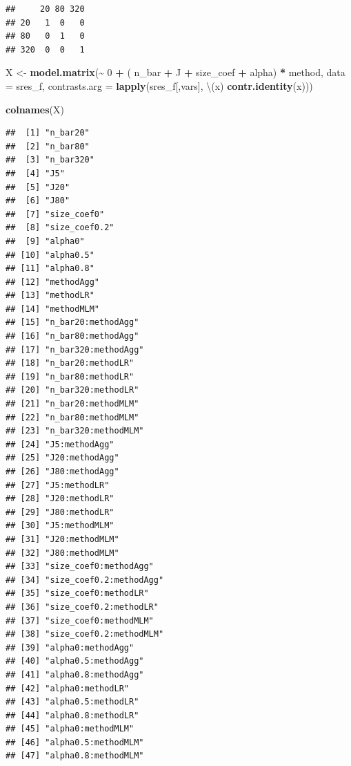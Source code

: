 \documentclass[
]{book}
\newenvironment{Shaded}{\begin{snugshade}}{\end{snugshade}}
\newcommand{\AttributeTok}[1]{\textcolor[rgb]{0.13,0.29,0.53}{#1}}
\newcommand{\DecValTok}[1]{\textcolor[rgb]{0.00,0.00,0.81}{#1}}
\newcommand{\FunctionTok}[1]{\textcolor[rgb]{0.13,0.29,0.53}{\textbf{#1}}}
\newcommand{\NormalTok}[1]{#1}
\newcommand{\OtherTok}[1]{\textcolor[rgb]{0.56,0.35,0.01}{#1}}
\newcommand{\SpecialCharTok}[1]{\textcolor[rgb]{0.81,0.36,0.00}{\textbf{#1}}}
\begin{document}
\begin{verbatim}
##     20 80 320
## 20   1  0   0
## 80   0  1   0
## 320  0  0   1
\end{verbatim}

\begin{Shaded}
\begin{Highlighting}[]
\NormalTok{X }\OtherTok{\textless{}{-}} \FunctionTok{model.matrix}\NormalTok{(}\SpecialCharTok{\textasciitilde{}} \DecValTok{0} \SpecialCharTok{+}\NormalTok{ ( n\_bar }\SpecialCharTok{+}\NormalTok{ J }\SpecialCharTok{+}\NormalTok{ size\_coef  }\SpecialCharTok{+}\NormalTok{ alpha) }\SpecialCharTok{*}\NormalTok{ method, }
                  \AttributeTok{data =}\NormalTok{ sres\_f,}
                  \AttributeTok{contrasts.arg =} \FunctionTok{lapply}\NormalTok{(sres\_f[,vars], }
\NormalTok{                                         \textbackslash{}(x) }\FunctionTok{contr.identity}\NormalTok{(x)))}

\FunctionTok{colnames}\NormalTok{(X)}
\end{Highlighting}
\end{Shaded}

\begin{verbatim}
##  [1] "n_bar20"               
##  [2] "n_bar80"               
##  [3] "n_bar320"              
##  [4] "J5"                    
##  [5] "J20"                   
##  [6] "J80"                   
##  [7] "size_coef0"            
##  [8] "size_coef0.2"          
##  [9] "alpha0"                
## [10] "alpha0.5"              
## [11] "alpha0.8"              
## [12] "methodAgg"             
## [13] "methodLR"              
## [14] "methodMLM"             
## [15] "n_bar20:methodAgg"     
## [16] "n_bar80:methodAgg"     
## [17] "n_bar320:methodAgg"    
## [18] "n_bar20:methodLR"      
## [19] "n_bar80:methodLR"      
## [20] "n_bar320:methodLR"     
## [21] "n_bar20:methodMLM"     
## [22] "n_bar80:methodMLM"     
## [23] "n_bar320:methodMLM"    
## [24] "J5:methodAgg"          
## [25] "J20:methodAgg"         
## [26] "J80:methodAgg"         
## [27] "J5:methodLR"           
## [28] "J20:methodLR"          
## [29] "J80:methodLR"          
## [30] "J5:methodMLM"          
## [31] "J20:methodMLM"         
## [32] "J80:methodMLM"         
## [33] "size_coef0:methodAgg"  
## [34] "size_coef0.2:methodAgg"
## [35] "size_coef0:methodLR"   
## [36] "size_coef0.2:methodLR" 
## [37] "size_coef0:methodMLM"  
## [38] "size_coef0.2:methodMLM"
## [39] "alpha0:methodAgg"      
## [40] "alpha0.5:methodAgg"    
## [41] "alpha0.8:methodAgg"    
## [42] "alpha0:methodLR"       
## [43] "alpha0.5:methodLR"     
## [44] "alpha0.8:methodLR"     
## [45] "alpha0:methodMLM"      
## [46] "alpha0.5:methodMLM"    
## [47] "alpha0.8:methodMLM"
\end{verbatim}
\end{document}
